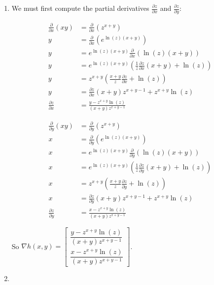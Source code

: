 \documentclass{article}
\begin{document}
\begin{enumerate}
\begin{enumerate}
\end{enumerate}

\item

We must first compute the partial derivatives $\frac{\partial z}{\partial x}$ and $\frac{\partial z}{\partial y}$:

 \begin{align*}
  \frac{\partial}{\partial x}(xy) &= \frac{\partial}{\partial x}(z^{x+y}) \\
  y &= \frac{\partial}{\partial x}(e^{\ln(z)(x+y)}) \\
  y &= e^{\ln(z)(x+y)}\frac{\partial}{\partial x}(\ln(z)(x+y)) \\
  y &= e^{\ln(z)(x+y)}(\frac{1}{z}\frac{\partial z}{\partial x}(x+y) + \ln(z)) \\
  y &= z^{x+y}(\frac{x+y}{z}\frac{\partial z}{\partial x} + \ln(z)) \\
  y &= \frac{\partial z}{\partial x}(x+y)z^{x+y-1} + z^{x+y}\ln(z) \\
  \frac{\partial z}{\partial x} &= \frac{y - z^{x+y}\ln(z)}{(x+y)z^{x+y-1}}
 \end{align*}

 \begin{align*}
  \frac{\partial}{\partial y}(xy) &= \frac{\partial}{\partial y}(z^{x+y}) \\
  x &= \frac{\partial}{\partial y}(e^{\ln(z)(x+y)}) \\
  x &= e^{\ln(z)(x+y)}\frac{\partial}{\partial y}(\ln(z)(x+y)) \\
  x &= e^{\ln(z)(x+y)}(\frac{1}{z}\frac{\partial z}{\partial y}(x+y) + \ln(z)) \\
  x &= z^{x+y}(\frac{x+y}{z}\frac{\partial z}{\partial y} + \ln(z)) \\
  x &= \frac{\partial z}{\partial y}(x+y)z^{x+y-1} + z^{x+y}\ln(z) \\
  \frac{\partial z}{\partial y} &= \frac{x - z^{x+y}\ln(z)}{(x+y)z^{x+y-1}}
 \end{align*}

So $\nabla h(x,y) = \begin{bmatrix}
                \dfrac{y - z^{x+y}\ln(z)}{(x+y)z^{x+y-1}} \\
                \dfrac{x - z^{x+y}\ln(z)}{(x+y)z^{x+y-1}}
               \end{bmatrix}$.

\item


\end{enumerate}
\end{document}
